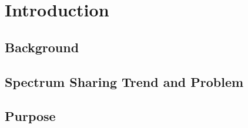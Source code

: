 \chapter[Introduction]{Introduction}
\label{chapter:introduction}

\section{Background}

\section{Spectrum Sharing Trend and Problem}

\section{Purpose}
